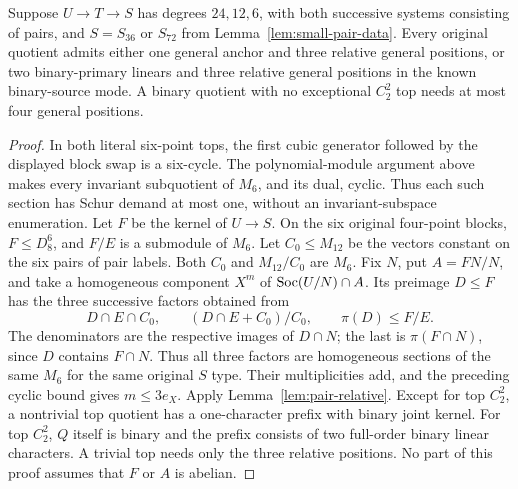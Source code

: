 \begin{lemma}\label{lem:paired-six}
Suppose $U\to T\to S$ has degrees $24,12,6$, with both successive
systems consisting of pairs, and $S=S_{36}$ or $S_{72}$ from
Lemma~\ref{lem:small-pair-data}. Every original quotient admits either
one general anchor and three relative general positions, or two
binary-primary linears and three relative general positions in the
known binary-source mode. A binary quotient with no exceptional
$C_2^2$ top needs at most four general positions.
\end{lemma}
\begin{proof}
In both literal six-point tops, the first cubic generator followed by
the displayed block swap is a six-cycle. The polynomial-module argument
above makes every invariant subquotient of $M_6$, and its dual, cyclic.
Thus each such section has Schur demand at most one, without an
invariant-subspace enumeration.
Let $F$ be the kernel of $U\to S$. On the six original four-point
blocks, $F\leq D_8^6$, and $F/E$ is a submodule of $M_6$.
Let $C_0\leq M_{12}$ be the vectors constant on the six pairs of
pair labels. Both $C_0$ and $M_{12}/C_0$ are $M_6$.
Fix $N$, put $A=FN/N$, and take a homogeneous component $X^m$ of
$\operatorname{Soc}(U/N)\cap A$. Its preimage $D\leq F$ has the three successive
factors obtained from
\[
 D\cap E\cap C_0,\qquad
 (D\cap E+C_0)/C_0,\qquad \pi(D)\leq F/E.
\]
The denominators are the respective images of $D\cap N$; the last
is $\pi(F\cap N)$, since $D$ contains $F\cap N$.
Thus all three factors are homogeneous sections of the same $M_6$
for the same original $S$ type. Their multiplicities add, and
the preceding cyclic bound gives $m\leq3e_X$.
Apply Lemma~\ref{lem:pair-relative}. Except for top $C_2^2$, a
nontrivial top quotient has a one-character prefix with binary joint
kernel. For top $C_2^2$, $Q$ itself is binary and the prefix consists
of two full-order binary linear characters. A trivial top needs only
the three relative positions. No part of this proof assumes that
$F$ or $A$ is abelian.
\end{proof}

